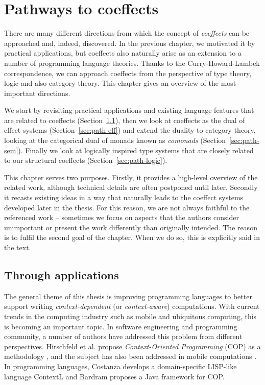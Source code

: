 \chapter{Pathways to coeffects} 
\label{ch:related-work} 


There are many different directions from which the concept of \emph{coeffects} can be approached 
and, indeed, discovered. In the previous chapter, we motivated it by practical applications, but 
coeffects also naturally arise as an extension to a number of programming language theories.
Thanks to the Curry-Howard-Lambek correspondence, we can approach coeffects from the perspective of 
type theory, logic and also category theory. This chapter gives an overview of the most 
important directions.

We start by revisiting practical applications and existing language features that are related to 
coeffects (Section~\ref{sec:path-apps}), then we look at coeffects as the dual of effect systems
(Section~\ref{sec:path-eff}) and extend the duality to category theory, looking at the categorical 
dual of monads known as \emph{comonads} (Section~\ref{sec:path-sem}). Finally we look at logically 
inspired type systems that are closely related to our structural coeffects 
(Section~\ref{sec:path-logic}).

This chapter serves two purposes. Firstly, it provides a high-level overview of the  related work, 
although technical details are often postponed until later. Secondly it recasts existing ideas in 
a way that naturally leads to the coeffect systems developed later in the thesis. For this reason, 
we are not always faithful to the referenced work -- sometimes we focus on aspects that the 
authors consider unimportant or present the work differently than originally intended. The reason 
is to fulfil the second goal of the chapter. When we do so, this is explicitly said in the text.


\section{Through applications}
\label{sec:path-apps}

The general theme of this thesis is improving programming languages to better support writing
\emph{context-dependent} (or \emph{context-aware}) computations. With current trends in the 
computing industry such as mobile and ubiquitous computing, this is becoming an important topic.
In software engineering and programming community, a number of authors have addressed this problem
from different perspectives. Hirschfeld et al. propose \emph{Context-Oriented Programming} (COP)
as a methodology \cite{app-cop-method}, and the subject has also been addressed in mobile
computations \cite{app-cop-mobile,app-cop-mobile2}. In programming languages, Costanza 
\cite{app-cop-contextl} develops a domain-specific LISP-like language ContextL and Bardram 
\cite{app-cop-javafwk} proposes a Java framework for COP.

